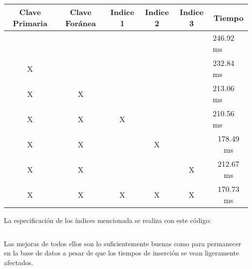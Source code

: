 \documentclass[a4paper, 11pt, oneside]{article} %
\newcommand{\scriptdir}{../scripts/} %
\begin{document}
\begin{table}[H]
\begin{tabular}{|c|c|c|l|l|l|}
\hline
Clave Primaria         & Clave Foránea         & Indice 1              & \multicolumn{1}{c|}{Indice 2} & \multicolumn{1}{c|}{Indice 3} & \multicolumn{1}{c|}{Tiempo}    \\ \hline
\multicolumn{1}{|l|}{} & \multicolumn{1}{l|}{} & \multicolumn{1}{l|}{} &                               &                               & 246.92 ms                      \\ \hline
X                      & \multicolumn{1}{l|}{} & \multicolumn{1}{l|}{} &                               &                               & 232.84 ms                      \\ \hline
X                      & X                     & \multicolumn{1}{l|}{} &                               &                               & 213.06 ms                      \\ \hline
X                      & X                     & X                     &                               &                               & 210.56 ms                      \\ \hline
X                      & X                     &                       & \multicolumn{1}{c|}{X}        & \multicolumn{1}{c|}{}         & \multicolumn{1}{c|}{178.49 ms} \\ \hline
X                      & X                     &                       & \multicolumn{1}{c|}{}         & \multicolumn{1}{c|}{X}        & \multicolumn{1}{c|}{212.67 ms} \\ \hline
X                      & X                     & X                     & \multicolumn{1}{c|}{X}        & \multicolumn{1}{c|}{X}        & \multicolumn{1}{c|}{170.73 ms} \\ \hline
\end{tabular}
\end{table}

La especificación de los índices mencionada se realiza con este código:

\inputminted{mysql}{\scriptdir consultas/setIndices.sql}

Las mejoras de todos ellos son lo suficientemente buenas como para permanecer en la base de datos a pesar de que los tiempos de inserción se vean ligeramente afectados.

\newpage

\end{document}

